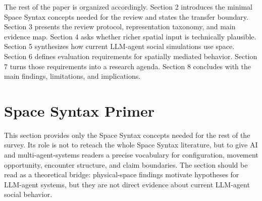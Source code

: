 \documentclass[
  twocolumn]{article}
\begin{document}
The rest of the paper is organized accordingly. Section 2 introduces the
minimal Space Syntax concepts needed for the review and states the
transfer boundary. Section 3 presents the review protocol,
representation taxonomy, and main evidence map. Section 4 asks whether
richer spatial input is technically plausible. Section 5 synthesizes how
current LLM-agent social simulations use space. Section 6 defines
evaluation requirements for spatially mediated behavior. Section 7 turns
those requirements into a research agenda. Section 8 concludes with the
main findings, limitations, and implications.

\section{Space Syntax Primer}\label{space-syntax-primer}

This section provides only the Space Syntax concepts needed for the rest
of the survey. Its role is not to reteach the whole Space Syntax
literature, but to give AI and multi-agent-systems readers a precise
vocabulary for configuration, movement opportunity, encounter structure,
and claim boundaries. The section should be read as a theoretical
bridge: physical-space findings motivate hypotheses for LLM-agent
systems, but they are not direct evidence about current LLM-agent social
behavior.
\end{document}
